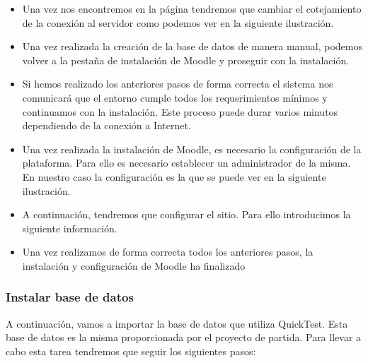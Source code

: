\begin{itemize}
	\item Una vez nos encontremos en la página tendremos que cambiar el cotejamiento de la conexión al servidor como podemos ver en la siguiente ilustración.
	
	\item Una vez realizada la creación de la base de datos de manera manual, podemos volver a la pestaña de instalación de Moodle y proseguir con la instalación.

	\item Si hemos realizado los anteriores pasos de forma correcta el sistema nos comunicará que el entorno cumple todos los requerimientos mínimos y continuamos con la instalación. Este proceso puede durar varios minutos dependiendo de la conexión a Internet.
	
	\item Una vez realizada la instalación de Moodle, es necesario la configuración de la plataforma. Para ello es necesario establecer un administrador de la misma. En nuestro caso la configuración es la que se puede ver en la siguiente ilustración. 
	
	\item A continuación, tendremos que configurar el sitio. Para ello introducimos la siguiente información. 
	
	\item Una vez realizamos de forma correcta todos los anteriores pasos, la instalación y configuración de Moodle ha finalizado

\end{itemize}

\subsubsection{Instalar base de datos}

A continuación, vamos a importar la base de datos que utiliza QuickTest. Esta base de datos es la misma proporcionada por el proyecto de partida. Para llevar a cabo esta tarea tendremos que seguir los siguientes pasos:

